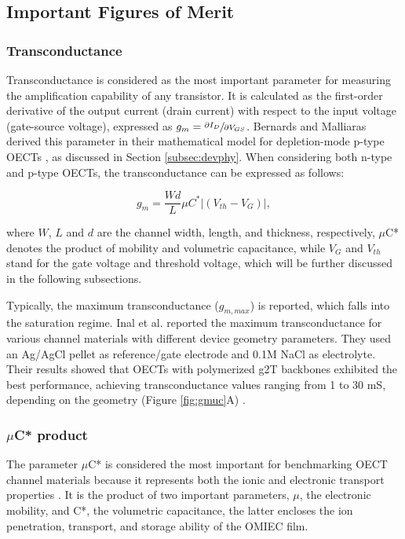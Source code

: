 \subsection{Important Figures of Merit}

\subsubsection{Transconductance}
Transconductance is considered as the most important parameter for measuring the amplification capability of any transistor. It is calculated as the first-order derivative of the output current (drain current) with respect to the input voltage (gate-source voltage), expressed as $g_{m} = \sfrac{\partial I_{D}}{\partial V_{GS}}$. Bernards and Malliaras derived this parameter in their mathematical model for depletion-mode p-type OECTs \cite{bernardsSteadyStateTransientBehavior2007}, as discussed in Section \ref{subsec:devphy}. When considering both n-type and p-type OECTs, the transconductance can be expressed as follows: %

\begin{equation}\label{eq:gm}
	g_{m} = \frac{Wd}{L} \mu C^{*} |(V_{th} - V_{G})|,
\end{equation}

where $W$, $L$ and $d$ are the channel width, length, and thickness, respectively, $\mu$C* denotes the product of mobility and volumetric capacitance, while $V_{G}$ and $V_{th}$ stand for the gate voltage and threshold voltage, which will be further discussed in the following subsections.

Typically, the maximum transconductance ($g_{m,max}$) is reported, which falls into the saturation regime. Inal et al. reported the maximum transconductance for various channel materials with different device geometry parameters. They used an Ag/AgCl pellet as reference/gate electrode and 0.1M NaCl as electrolyte. Their results showed that OECTs with polymerized g2T backbones exhibited the best performance, achieving transconductance values ranging from 1 to 30 mS, depending on the geometry (Figure \ref{fig:gmuc}A) \cite{inalBenchmarkingOrganicMixed2017}.

\subsubsection{$\mu$C* product}

The parameter $\mu$C* is considered the most important for benchmarking OECT channel materials because it represents both the ionic and electronic transport properties %
\cite{inalBenchmarkingOrganicMixed2017}. %
It is the product of two important parameters, $\mu$, the electronic mobility, and C*, the volumetric capacitance, the latter encloses the ion penetration, transport, and storage ability of the OMIEC film.

